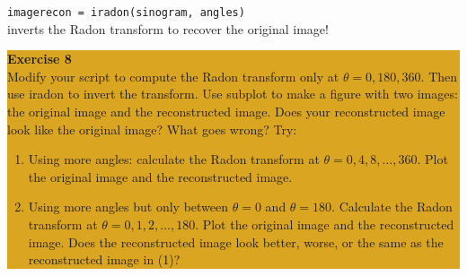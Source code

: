 \documentclass[12pt]{amsart}
\begin{document}
\verb+imagerecon = iradon(sinogram, angles)+ \\

\noindent inverts the Radon transform to recover the original image!

\bigskip
\begin{center}
\colorbox{Goldenrod}{\parbox{15cm}{
{
\textbf{\large Exercise 8}\vspace{1mm} 
\\ 
Modify your script to compute the Radon transform only at $\theta = 0, 180, 360$.  Then use iradon to invert the transform.  Use subplot to make a figure with two images: the original image and the reconstructed image.   Does your reconstructed image look like the original image?  What goes wrong?  Try:\\
\begin{enumerate}
\item Using more angles:  calculate the Radon transform at $\theta = 0, 4, 8, \ldots, 360$.  Plot the original image and the reconstructed image.
\item Using more angles but only between $\theta = 0$ and $\theta = 180$.  Calculate the Radon transform at $\theta = 0, 1, 2, \ldots, 180$.  Plot the original image and the reconstructed image.  Does the reconstructed image look better, worse, or the same as the reconstructed image in (1)?
\end{enumerate}
 }}}
\end{center}
\end{document}
